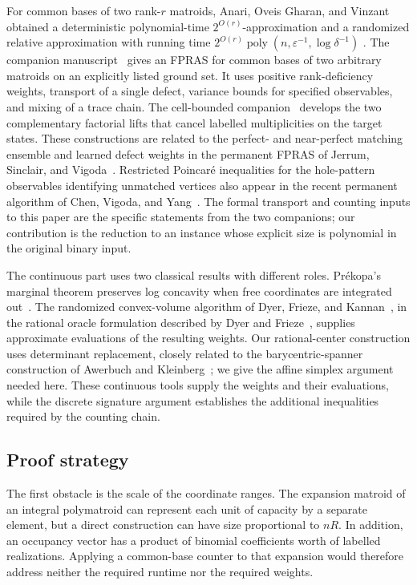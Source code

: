 For common bases of two rank-$r$ matroids, Anari, Oveis Gharan, and
Vinzant obtained a deterministic polynomial-time $2^{O(r)}$-approximation
and a randomized relative approximation with running time
$2^{O(r)}\operatorname{poly}(n,\varepsilon^{-1},\log\delta^{-1})$
\cite[Theorem~1.3 and Corollary~1.4]{AOV2021}.
The companion manuscript~\cite{Parent} gives an FPRAS for common bases
of two arbitrary matroids on an explicitly listed ground set.
It uses positive rank-deficiency weights, transport of a single defect,
variance bounds for specified observables, and mixing of a trace chain.
The cell-bounded companion~\cite{CB} develops the two complementary
factorial lifts that cancel labelled multiplicities on the target
states. These constructions are related to the perfect- and near-perfect
matching ensemble and learned defect weights in the permanent FPRAS of
Jerrum, Sinclair, and Vigoda~\cite{JSV2004}. Restricted Poincar{\'e}
inequalities for the hole-pattern observables identifying unmatched
vertices also appear in the recent permanent algorithm of Chen,
Vigoda, and Yang~\cite{CVY2026}. The formal transport
and counting inputs to this paper are the specific statements from
the two companions; our contribution is the reduction to an instance
whose explicit size is polynomial in the original binary input.

The continuous part uses two classical results with different roles.
Pr{\'e}kopa's marginal theorem preserves log concavity when free
coordinates are integrated out~\cite[Theorem~6]{Prekopa1973}.
The randomized convex-volume algorithm of Dyer, Frieze, and
Kannan~\cite{DFK1991}, in the rational oracle formulation described by
Dyer and Frieze~\cite{DyerFrieze1991}, supplies approximate evaluations of
the resulting weights. Our rational-center construction uses determinant
replacement, closely related to the barycentric-spanner construction of
Awerbuch and Kleinberg~\cite[Proposition~2.4]{AK2004}; we give the affine
simplex argument needed here. These continuous tools supply the weights
and their evaluations, while the discrete signature argument establishes
the additional inequalities required by the counting chain.

\subsection{Proof strategy}

The first obstacle is the scale of the coordinate ranges. The expansion
matroid of an integral polymatroid can represent each unit of capacity by
a separate element, but a direct construction can have size proportional
to $nR$. In addition, an occupancy vector has a product of binomial
coefficients worth of labelled realizations. Applying a common-base
counter to that expansion would therefore address neither the required
runtime nor the required weights.

